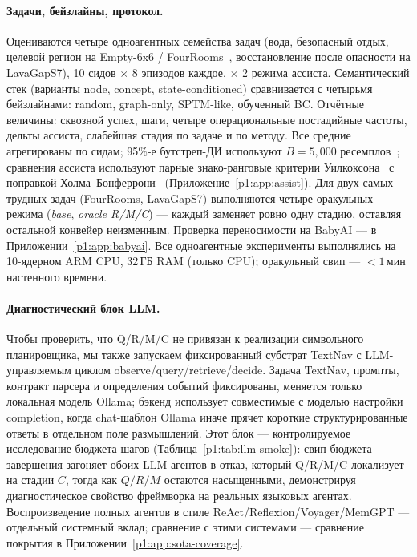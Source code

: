 \documentclass{article}
\begin{document}
\paragraph{Задачи, бейзлайны, протокол.}
Оцениваются четыре одноагентных семейства задач (вода, безопасный отдых, целевой регион на Empty-6x6 / FourRooms~\citep{sutton1999between}, восстановление после опасности на LavaGapS7), 10 сидов $\times$ 8 эпизодов каждое, $\times$ 2 режима ассиста. Семантический стек (варианты node, concept, state-conditioned) сравнивается с четырьмя бейзлайнами: random, graph-only, SPTM-like, обученный BC. Отчётные величины: сквозной успех, шаги, четыре операциональные постадийные частоты, дельты ассиста, слабейшая стадия по задаче и по методу. Все средние агрегированы по сидам; 95\%-е бутстреп-ДИ используют $B{=}5{,}000$ ресемплов~\citep{efron1979bootstrap}; сравнения ассиста используют парные знако-ранговые критерии Уилкоксона~\citep{wilcoxon1945individual} с поправкой Холма--Бонферрони~\citep{holm1979simple} (Приложение~\ref{p1:app:assist}). Для двух самых трудных задач (FourRooms, LavaGapS7) выполняются четыре оракульных режима (\emph{base}, \emph{oracle R/M/C}) --- каждый заменяет ровно одну стадию, оставляя остальной конвейер неизменным. Проверка переносимости на BabyAI --- в Приложении~\ref{p1:app:babyai}. Все одноагентные эксперименты выполнялись на 10-ядерном ARM CPU, 32\,ГБ RAM (только CPU); оракульный свип --- $<1$\,мин настенного времени.

\paragraph{Диагностический блок LLM.}
Чтобы проверить, что Q/R/M/C не привязан к реализации символьного планировщика, мы также запускаем фиксированный субстрат TextNav с LLM-управляемым циклом observe/query/retrieve/decide. Задача TextNav, промпты, контракт парсера и определения событий фиксированы, меняется только локальная модель Ollama; бэкенд использует совместимые с моделью настройки completion, когда chat-шаблон Ollama иначе прячет короткие структурированные ответы в отдельном поле размышлений. Этот блок --- контролируемое исследование бюджета шагов (Таблица~\ref{p1:tab:llm-smoke}): свип бюджета завершения загоняет обоих LLM-агентов в отказ, который Q/R/M/C локализует на стадии $C$, тогда как $Q/R/M$ остаются насыщенными, демонстрируя диагностическое свойство фреймворка на реальных языковых агентах. Воспроизведение полных агентов в стиле ReAct/Reflexion/Voyager/MemGPT --- отдельный системный вклад; сравнение с этими системами --- сравнение покрытия в Приложении~\ref{p1:app:sota-coverage}.
\end{document}
